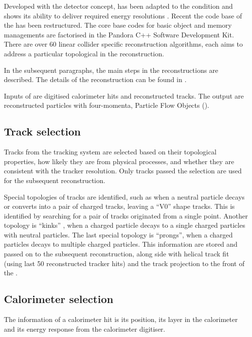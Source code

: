 Developed with the \ILD detector concept, \pandora has been adapted to the \CLIC condition and shows its ability to deliver required energy resolutions \cite{Linssen:2012hp}. Recent the code base of the \pandora has been restructured. The core base codes for basic object and memory managements are factorised in the Pandora C++ Software Development Kit\cite{Marshall:2015rfa}. There are over 60 linear collider specific reconstruction algorithms, each aims to address a particular topological in the reconstruction.

In the subsequent paragraphs, the main steps in the \pandora reconstructions are described. The details of the reconstruction can be found in \cite{Thomson:2009rp,Marshall:2012ry,Marshall:2015rfa}.

Inputs of \pandora are digitised calorimeter hits and reconstructed tracks. The output are reconstructed particles with four-momenta, Particle Flow Objects (\PFOs).

\subsection{Track selection}
\label{sec:pandoraPandoraTrack}
Tracks from the tracking system are selected based on their topological properties, how likely they are from physical processes, and whether they are consistent with the tracker resolution. Only tracks passed the selection are used for the subsequent reconstruction.

Special topologies of tracks are identified, such as when a neutral particle decays or converts into a pair of charged tracks, leaving a ``V0''  shape tracks. This is identified by searching for a pair of tracks originated from a single point. Another topology is ``kinks'' , when a charged particle decays to a single charged particles with neutral particles. The last special topology is  ``prongs'', when a charged particles decays to multiple charged particles. This information are stored and passed on to the subsequent reconstruction, along side with helical track fit (using last 50 reconstructed tracker hits) and the track projection to the front of the \ECAL.

\subsection{Calorimeter selection}

The information of a calorimeter hit is its position, its layer in the calorimeter and its energy response from the calorimeter digitiser.

